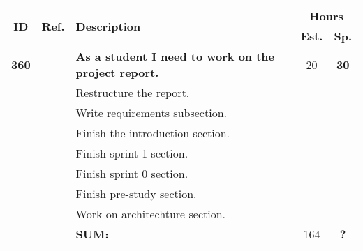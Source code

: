 \label{tab:sprint2Documentationstories}
\def\arraystretch{1.25}
 
\begin{longtable}{ccXcc}

\toprule[0.5mm]
\multirow{2}{*}{\textbf{ID}} &
\multirow{2}{*}{\textbf{Ref.}} & \multirow{2}{*}{\textbf{Description}} & \multicolumn{2}{c}{\textbf{Hours}} \\
 					& & & \textbf{Est.} & \textbf{Sp.} \\
\midrule
\textbf{360} 	& {M6}
	& {\bf As a student I need to work on the project report.} 	& 	20	& \textbf{ 30} \\
				&& Restructure the report.	&  &  \\
				&& Write requirements subsection.	&  &  \\
				&& Finish the introduction section.	&  & \\
				&& Finish sprint 1 section.	&  &  \\
				&& Finish sprint 0 section.	&  &  \\
				&& Finish pre-study section.	&  &  \\
				&& Work on architechture section.	&  &  \\
							
				
\hline
				&& \textbf{SUM:}		&		164	& \textbf{?}
 \\																			
\bottomrule[0.5mm]
\end{longtable}

